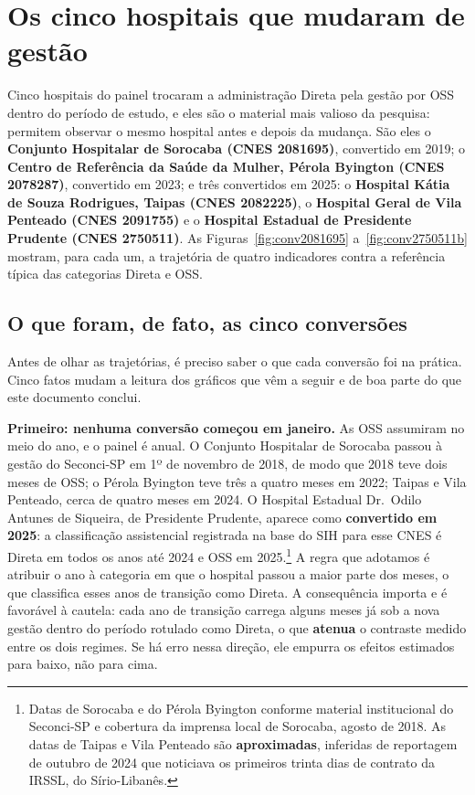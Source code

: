 \section{Os cinco hospitais que mudaram de gestão}
\label{sec:conversores}

Cinco hospitais do painel trocaram a administração Direta pela gestão
por OSS dentro do período de estudo, e eles são o material mais valioso
da pesquisa: permitem observar o mesmo hospital antes e depois da
mudança. São eles o \textbf{Conjunto Hospitalar de Sorocaba (CNES
2081695)}, convertido em 2019; o \textbf{Centro de Referência da Saúde
da Mulher, Pérola Byington (CNES 2078287)}, convertido em 2023; e três
convertidos em 2025: o \textbf{Hospital Kátia de Souza Rodrigues,
Taipas (CNES 2082225)}, o \textbf{Hospital Geral de Vila Penteado (CNES
2091755)} e o \textbf{Hospital Estadual de Presidente Prudente (CNES
2750511)}. As Figuras~\ref{fig:conv2081695}
a~\ref{fig:conv2750511b} mostram, para cada um, a trajetória de quatro
indicadores contra a referência típica das categorias Direta e OSS.

\subsection{O que foram, de fato, as cinco conversões}
\label{sub:oqueforam}

Antes de olhar as trajetórias, é preciso saber o que cada conversão foi
na prática. Cinco fatos mudam a leitura dos gráficos que vêm a seguir e
de boa parte do que este documento conclui.

\textbf{Primeiro: nenhuma conversão começou em janeiro.} As OSS
assumiram no meio do ano, e o painel é anual. O Conjunto Hospitalar de
Sorocaba passou à gestão do Seconci-SP em 1º de novembro de 2018, de
modo que 2018 teve dois meses de OSS; o Pérola Byington teve três a
quatro meses em 2022; Taipas e Vila Penteado, cerca de quatro meses em
2024. O Hospital Estadual Dr.\ Odilo Antunes de Siqueira, de Presidente
Prudente, aparece como \textbf{convertido em 2025}: a classificação
assistencial registrada na base do SIH para esse CNES é Direta em todos
os anos até 2024 e OSS em 2025.\footnote{Datas de Sorocaba e do Pérola
Byington conforme material institucional do Seconci-SP e cobertura da
imprensa local de Sorocaba, agosto de 2018. As datas de Taipas e Vila
Penteado são \textbf{aproximadas}, inferidas de reportagem de outubro de
2024 que noticiava os primeiros trinta dias de contrato da IRSSL, do
Sírio-Libanês.} A regra que
adotamos é atribuir o ano à categoria em que o hospital passou a maior
parte dos meses, o que classifica esses anos de transição como Direta. A
consequência importa e é favorável à cautela: cada ano de transição
carrega alguns meses já sob a nova gestão dentro do período rotulado
como Direta, o que \textbf{atenua} o contraste medido entre os dois
regimes. Se há erro nessa direção, ele empurra os efeitos estimados para
baixo, não para cima.

